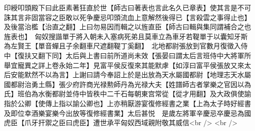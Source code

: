印綬叩頭殿下曰此臣素著狂直於世【師古曰著表也言此名久已章表】使其言是不可誅其言非固當容之臣敢以死争慶忌叩頭流血上意解然後得已【言殺雲之事得止也】及後當治檻【治直之翻】上曰勿易因而輯之以旌直臣【師古曰輯與集同謂補合之也旌表也】　匈奴搜諧單于將入朝未入塞病死弟且莫車立為車牙若鞮單于以囊知牙斯為左賢王【單音蟬且子余翻車尺遮翻鞮丁奚翻】　北地都尉張放到官數月復徵入侍中【復扶又翻下同】太后與上書曰前所道尚未效【張晏曰謂太后言班侍中大將軍所舉宜寵異之詳上卷永始二年】見富平侯反復來其能默虖【如淳曰富平侯張放又來太后安能默然不以為言】上謝曰請今奉詔上於是出放為天水屬國都尉【地理志天水屬國都尉治勇土縣】張少府許商光禄勲師丹為光禄大夫【姓譜師古者掌樂之官因以為氏】班伯為水衡都尉並侍中皆秩中二千石每朝東宫常從【從才用翻】及大政俱使諭指於公卿【使傳上指以諭公卿也】上亦稍厭游宴復修經書之業【上為太子時好經書及即位幸酒樂宴樂今出放等復修經書業】太后甚悦　是歲左將軍辛慶忌卒慶忌為國虎臣【爪牙扞禦之臣曰虎臣】遭世承平匈奴西域親附敬其威信<br />
<br />
